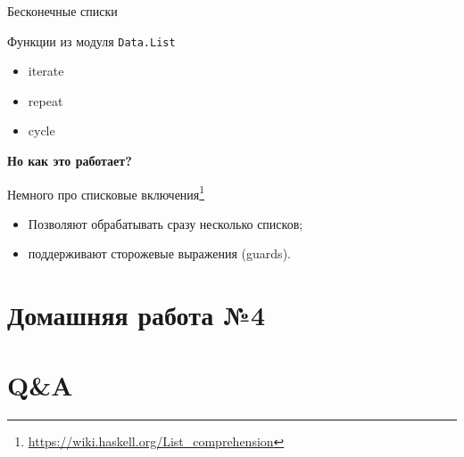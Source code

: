 \documentclass{beamer}
\begin{document}
  \begin{frame}{Бесконечные списки}
      \begin{block}{Функции из модуля \texttt{Data.List}}
        \begin{itemize}
            \item iterate
            \item repeat
            \item cycle
        \end{itemize}
      \end{block}
      \pause
      \begin{center}
          \textbf{Но как это работает?}
      \end{center}
  \end{frame}
  \begin{frame}{Немного про списковые включения\footnote{\url{https://wiki.haskell.org/List_comprehension}}}
      \begin{itemize}
          \item Позволяют обрабатывать сразу несколько списков;
          \item поддерживают сторожевые выражения (guards).
      \end{itemize}
      \begin{center}
          \textbf{}
      \end{center}
  \end{frame}
  \section{Домашняя работа №4}
  \section{Q\&A}
\end{document}
